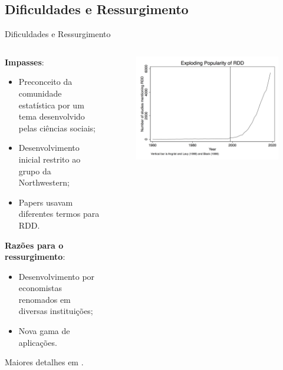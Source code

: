 \documentclass[aspectratio=1610, 10pt]{beamer}
\begin{document}
\setlength{\abovedisplayskip}{0.5em}
\setlength{\belowdisplayskip}{0.5em}


\subsection{Dificuldades e Ressurgimento}

\begin{frame}{Dificuldades e Ressurgimento}
\vspace{-0.4cm}
    \begin{columns}[T]
		\begin{column}{0.48\linewidth} %

                \textbf{Impasses}:
                \begin{itemize}
                    \item Preconceito da comunidade estatística por um tema desenvolvido pelas ciências sociais;
                    \item Desenvolvimento inicial restrito ao grupo da Northwestern;
                    \item Papers usavam diferentes termos para RDD.
                \end{itemize}
                \textbf{Razões para o ressurgimento}:
                \begin{itemize}
                    \item Desenvolvimento por economistas renomados em diversas instituições;
                    \item Nova gama de aplicações.
                \end{itemize}

                \vspace{5pt}
                \tiny{Maiores detalhes em \cite{cook2008waiting}.}
		\end{column}
		\begin{column}{0.48\linewidth} %
            \vspace{0.3cm}
            \begin{figure}
                \centering
                \includegraphics[width=0.95\linewidth]{fig/RDDovertime.jpg}


\end{figure}
\end{column}
\end{columns}
\end{frame}
\end{document}
